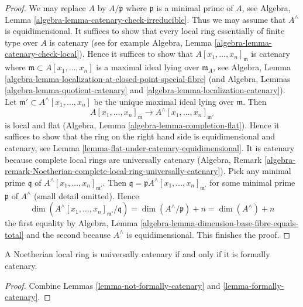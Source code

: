 \begin{proof}
We may replace $A$ by $A/\mathfrak p$ where $\mathfrak p$ is a minimal prime
of $A$, see Algebra, Lemma \ref{algebra-lemma-catenary-check-irreducible}.
Thus we may assume that $A^\wedge$ is equidimensional.
It suffices to show that every local ring essentially of finite type
over $A$ is catenary (see for example
Algebra, Lemma \ref{algebra-lemma-catenary-check-local}).
Hence it suffices to show that $A[x_1, \ldots, x_n]_\mathfrak m$ is catenary
where $\mathfrak m \subset A[x_1, \ldots, x_n]$ is a maximal
ideal lying over $\mathfrak m_A$, see
Algebra, Lemma \ref{algebra-lemma-localization-at-closed-point-special-fibre}
(and Algebra, Lemmas \ref{algebra-lemma-quotient-catenary} and
\ref{algebra-lemma-localization-catenary}).
Let $\mathfrak m' \subset A^\wedge[x_1, \ldots, x_n]$ be the unique
maximal ideal lying over $\mathfrak m$. Then
$$
A[x_1, \ldots, x_n]_\mathfrak m \to A^\wedge[x_1, \ldots, x_n]_{\mathfrak m'}
$$
is local and flat (Algebra, Lemma \ref{algebra-lemma-completion-flat}).
Hence it suffices to show that the ring on the right
hand side is equidimensional and catenary, see
Lemma \ref{lemma-flat-under-catenary-equidimensional}.
It is catenary because complete local rings are universally catenary
(Algebra, Remark
\ref{algebra-remark-Noetherian-complete-local-ring-universally-catenary}).
Pick any minimal prime $\mathfrak q$ of
$A^\wedge[x_1, \ldots, x_n]_{\mathfrak m'}$. Then
$\mathfrak q = \mathfrak p A^\wedge[x_1, \ldots, x_n]_{\mathfrak m'}$
for some minimal prime $\mathfrak p$ of $A^\wedge$ (small detail omitted).
Hence
$$
\dim(A^\wedge[x_1, \ldots, x_n]_{\mathfrak m'}/\mathfrak q) =
\dim(A^\wedge/\mathfrak p) + n = \dim(A^\wedge) + n
$$
the first equality by
Algebra, Lemma \ref{algebra-lemma-dimension-base-fibre-equals-total}
and the second because $A^\wedge$ is equidimensional.
This finishes the proof.
\end{proof}

\begin{proposition}[Ratliff]
\label{proposition-ratliff}
\begin{reference}
\cite{Ratliff}
\end{reference}
A Noetherian local ring is universally catenary if and only if
it is formally catenary.
\end{proposition}

\begin{proof}
Combine Lemmas \ref{lemma-not-formally-catenary} and
\ref{lemma-formally-catenary}.
\end{proof}



